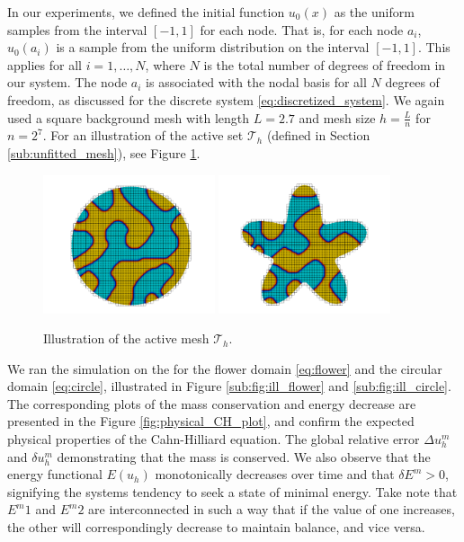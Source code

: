 \documentclass[11pt]{article}
\theoremstyle{remark}
\numberwithin{equation}{section}
\begin{document}
In our experiments, we defined the initial function $u_{0}(x)$ as the uniform samples from the interval $[-1, 1]$ for each node. That is, for each node $a_{i}$, $u_{0}(a_{i})$ is a sample from the uniform distribution on the interval $[-1, 1]$. This
applies for all $i = 1, \ldots, N$, where $N$ is the total number of degrees of freedom in our system. The node $a_{i}$ is associated with the nodal basis for all $N$ degrees of freedom, as discussed for the discrete system
\eqref{eq:discretized_system}. We again used a square background mesh with length $L=2.7$ and mesh size $h=\frac{L}{n}$ for $n=2^{7}$. For an illustration of the active set $\mathcal{T}_{h} $ (defined in Section \ref{sub:unfitted_mesh}), see Figure \ref{sub:fig:active_mesh}.

\begin{figure}[H]
    \centering
    \hfill
        \includegraphics[width=0.45\textwidth]{results/illustration/active_circle.png}
    \hfill
        \includegraphics[width=0.45\textwidth]{results/illustration/active_flower.png}
    \caption{Illustration of the active mesh $\mathcal{T}_{h} $.}
    \label{sub:fig:active_mesh}
\end{figure}


We ran the simulation on the for the flower domain \eqref{eq:flower} and the circular domain \eqref{eq:circle}, illustrated in Figure \ref{sub:fig:ill_flower} and \ref{sub:fig:ill_circle}. The corresponding plots of the mass conservation and energy decrease are presented
in the Figure \ref{fig:physical_CH_plot}, and confirm the expected physical properties of the Cahn-Hilliard equation. The global relative error $\Delta u^{m}_{h}$ and $\delta u^{m}_{h}$ demonstrating that the mass is conserved. We also observe that the energy functional
$E(u_h)$ monotonically decreases over time and that $\delta E^{m} >0$, signifying the systems tendency to seek a state of minimal energy. Take note that $E^{m}{1}$ and $E^{m}{2}$ are interconnected in such a way that if the value of one increases, the other will correspondingly decrease to maintain balance, and vice versa.
\end{document}
